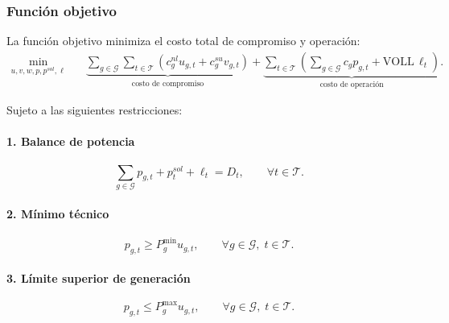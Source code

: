 \documentclass[
	spanish, %
	letterpaper, oneside
]{article}
\begin{document}
\subsubsection*{Función objetivo}

La función objetivo minimiza el costo total de compromiso y operación:
\begin{equation}
\begin{aligned}
    \min_{u,v,w,p,p^{sol},\ell} \quad
    &\underbrace{
    \sum_{g\in\mathcal{G}}\sum_{t\in\mathcal{T}}
    \left(
        c^{nl}_g u_{g,t}
        +
        c^{su}_g v_{g,t}
    \right)
    }_{\text{costo de compromiso}}
    +
    \underbrace{
    \sum_{t\in\mathcal{T}}
    \left(
        \sum_{g\in\mathcal{G}} c_g p_{g,t}
        +
        \mathrm{VOLL}\,\ell_t
    \right)
    }_{\text{costo de operación}}.
\end{aligned}
\label{eq:objetivo_determinista}
\end{equation}

Sujeto a las siguientes restricciones:

\paragraph{1. Balance de potencia}

\begin{equation}
    \sum_{g\in\mathcal{G}} p_{g,t}
    +
    p^{sol}_t
    +
    \ell_t
    =
    D_t,
    \qquad 
    \forall t\in\mathcal{T}.
    \label{eq:balance_potencia_determinista}
\end{equation}

\paragraph{2. Mínimo técnico}

\begin{equation}
    p_{g,t}
    \geq
    P^{\min}_g u_{g,t},
    \qquad 
    \forall g\in\mathcal{G},\; t\in\mathcal{T}.
    \label{eq:minimo_tecnico_determinista}
\end{equation}

\paragraph{3. Límite superior de generación}

\begin{equation}
    p_{g,t}
    \leq
    P^{\max}_g u_{g,t},
    \qquad 
    \forall g\in\mathcal{G},\; t\in\mathcal{T}.
    \label{eq:limite_superior_generacion_determinista}
\end{equation}
\end{document}
